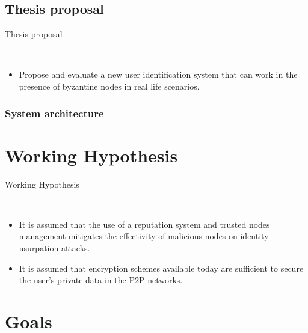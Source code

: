 \documentclass[12pt]{beamer}
\renewcommand{\frametitle}[1]{\vspace{0.2cm}\begin{huge}#1\end{huge}\\}
\renewcommand{\framesubtitle}[1]{\vspace{0.4cm} \hspace{0.4cm}\begin{large}#1\end{large}\\}
\begin{document}
  



  \subsection{Thesis proposal}
    \begin{frame}
    \frametitle{Thesis proposal}
    \begin{itemize}
      \item Propose and evaluate a new user identification system that can work
in the presence of byzantine nodes in real life scenarios.
    \end{itemize}
    \end{frame}

  \subsubsection{System architecture}

  \section{Working Hypothesis}
    \begin{frame}
    \frametitle{Working Hypothesis}
      \begin{itemize}
          \item It is assumed that the use of a reputation system and trusted nodes
            management mitigates the effectivity of malicious nodes on identity
            usurpation attacks.
          \item It is assumed that encryption schemes available today are
            sufficient to secure the user's private data in the P2P networks.
      \end{itemize}
    \end{frame}

  \section{Goals}
\end{document}

